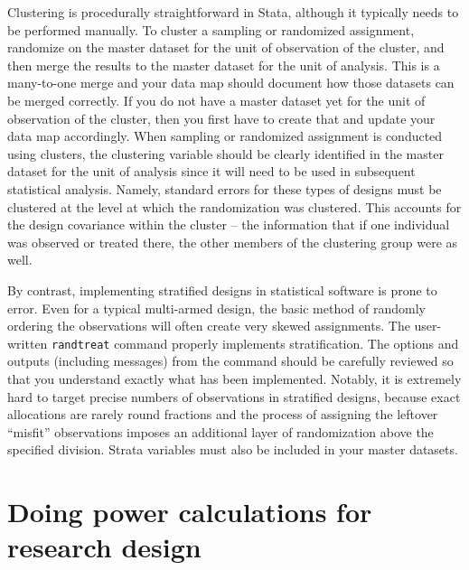 Clustering is procedurally straightforward in Stata,
although it typically needs to be performed manually.
To cluster a sampling or randomized assignment,
randomize on the master dataset for the unit of observation of the cluster,
and then merge the results to the master dataset for the unit of analysis.
This is a many-to-one merge and your data map should document
how those datasets can be merged correctly.
If you do not have a master dataset yet for the unit of observation of the cluster,
then you first have to create that and update your data map accordingly.
When sampling or randomized assignment is conducted using clusters,
the clustering variable should be clearly identified in the master dataset
for the unit of analysis
since it will need to be used in subsequent statistical analysis.
Namely, standard errors for these types of designs must be clustered
at the level at which the randomization was clustered.
This accounts for the design covariance within the cluster --
the information that if one individual was observed or treated there,
the other members of the clustering group were as well.

By contrast, implementing stratified designs in statistical software is prone to error.
Even for a typical multi-armed design, the basic method of randomly ordering the observations
will often create very skewed assignments.
The user-written \texttt{randtreat} command properly implements stratification.\cite{carril2017dealing}
The options and outputs (including messages) from the command should be carefully reviewed
so that you understand exactly what has been implemented.
Notably, it is extremely hard to target precise numbers of observations
in stratified designs, because exact allocations are rarely round fractions
and the process of assigning the leftover ``misfit'' observations
imposes an additional layer of randomization above the specified division.
Strata variables must also be included in your master datasets.


\section{Doing power calculations for research design}

